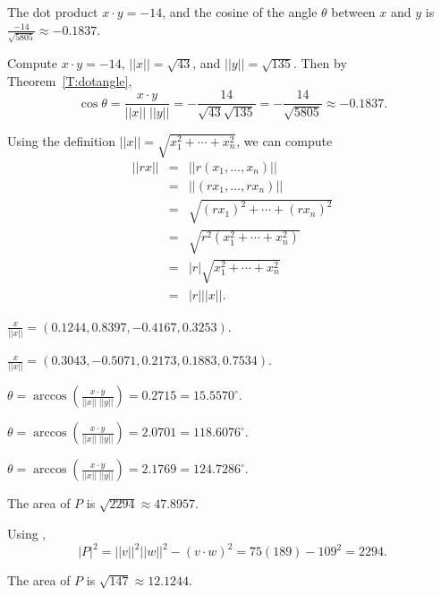  \ans The dot product $x \cdot y = -14$, and the cosine
of the angle $\theta$ between $x$ and $y$ is
$\frac{-14}{\sqrt{5805}} \approx -0.1837$.

\soln Compute $x \cdot y = -14$, $||x|| = \sqrt{43}$, and $||y|| = \sqrt{135}$.
Then by Theorem~\ref{T:dotangle},
\[
\cos\theta = \frac{x \cdot y}{||x||\;||y||} = -\frac{14}{\sqrt{43}\sqrt{135}}
= -\frac{14}{\sqrt{5805}} \approx -0.1837.
\]

 Using the definition $||x|| = \sqrt{x_1^2 + \cdots + x_n^2}$,
we can compute
\[
\begin{array}{rcl}
||rx|| & = & ||r(x_1,\dots,x_n)|| \\
& = & ||(rx_1,\dots,rx_n)|| \\
& = & \sqrt{(rx_1)^2 + \cdots + (rx_n)^2} \\
& = & \sqrt{r^2(x_1^2 + \cdots + x_n^2)} \\
& = & |r|\sqrt{x_1^2 + \cdots + x_n^2} \\
& = & |r| ||x||.
\end{array}
\]



$\frac{x}{||x||} = (0.1244, 0.8397, -0.4167, 0.3253)$.

$\frac{x}{||x||} = (0.3043, -0.5071, 0.2173, 0.1883, 0.7534)$.

 $\theta =
\arccos \left(\frac{x \cdot y}{||x||\;||y||}\right) =
0.2715 = 15.5570^\circ$.

 $\theta =
\arccos \left(\frac{x \cdot y}{||x||\;||y||}\right) =
2.0701 = 118.6076^\circ$.

 $\theta =
\arccos \left(\frac{x \cdot y}{||x||\;||y||}\right) =
2.1769 = 124.7286^\circ$.

 \ans The area of $P$ is $\sqrt{2294} \approx 47.8957$.

\soln Using ,
\[
|P|^2 = ||v||^2||w||^2 - (v \cdot w)^2 = 75(189) - 109^2 = 2294.
\]

 \ans The area of $P$ is $\sqrt{147} \approx 12.1244$.
